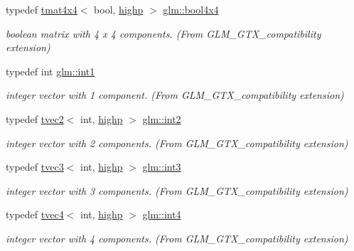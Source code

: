\begin{DoxyCompactItemize}
typedef \mbox{\hyperlink{structglm_1_1tmat4x4}{tmat4x4}}$<$ bool, \mbox{\hyperlink{namespaceglm_a0f04f086094c747d227af4425893f545ac6f7eab42eacbb10d59a58e95e362074}{highp}} $>$ \mbox{\hyperlink{group__gtx__compatibility_gafd4a5a69fab4d76f91ee75684f3bf2f1}{glm\+::bool4x4}}
\begin{DoxyCompactList}\small\item\em boolean matrix with 4 x 4 components. (From G\+L\+M\+\_\+\+G\+T\+X\+\_\+compatibility extension) \end{DoxyCompactList}\item 
typedef int \mbox{\hyperlink{group__gtx__compatibility_gaba41d7803e4b24c17656d74377b88286}{glm\+::int1}}
\begin{DoxyCompactList}\small\item\em integer vector with 1 component. (From G\+L\+M\+\_\+\+G\+T\+X\+\_\+compatibility extension) \end{DoxyCompactList}\item 
typedef \mbox{\hyperlink{structglm_1_1tvec2}{tvec2}}$<$ int, \mbox{\hyperlink{namespaceglm_a0f04f086094c747d227af4425893f545ac6f7eab42eacbb10d59a58e95e362074}{highp}} $>$ \mbox{\hyperlink{group__gtx__compatibility_ga89f98d125d3e73b50e34bc35d93796f1}{glm\+::int2}}
\begin{DoxyCompactList}\small\item\em integer vector with 2 components. (From G\+L\+M\+\_\+\+G\+T\+X\+\_\+compatibility extension) \end{DoxyCompactList}\item 
typedef \mbox{\hyperlink{structglm_1_1tvec3}{tvec3}}$<$ int, \mbox{\hyperlink{namespaceglm_a0f04f086094c747d227af4425893f545ac6f7eab42eacbb10d59a58e95e362074}{highp}} $>$ \mbox{\hyperlink{group__gtx__compatibility_gafc297ec294f5aa0360a634656c20e1d0}{glm\+::int3}}
\begin{DoxyCompactList}\small\item\em integer vector with 3 components. (From G\+L\+M\+\_\+\+G\+T\+X\+\_\+compatibility extension) \end{DoxyCompactList}\item 
typedef \mbox{\hyperlink{structglm_1_1tvec4}{tvec4}}$<$ int, \mbox{\hyperlink{namespaceglm_a0f04f086094c747d227af4425893f545ac6f7eab42eacbb10d59a58e95e362074}{highp}} $>$ \mbox{\hyperlink{group__gtx__compatibility_gab93125af983ab22b9647b64770b26aa1}{glm\+::int4}}
\begin{DoxyCompactList}\small\item\em integer vector with 4 components. (From G\+L\+M\+\_\+\+G\+T\+X\+\_\+compatibility extension) \end{DoxyCompactList}\item 

\end{DoxyCompactItemize}
